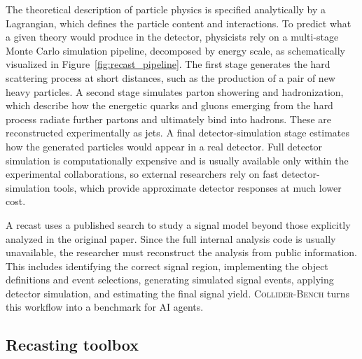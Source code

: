 \documentclass{article}
\newcommand{\ColliderBench}{\textsc{Collider-Bench}}
\begin{document}
The theoretical description of particle physics is specified analytically by a Lagrangian, which defines the particle content and interactions. To predict what a given theory would produce in the detector, physicists rely on a multi-stage Monte Carlo simulation pipeline, decomposed by energy scale, as schematically visualized in Figure~\ref{fig:recast_pipeline}. The first stage generates the hard scattering process at short distances, such as the production of a pair of new heavy particles. A second stage simulates parton showering and hadronization, which describe how the energetic quarks and gluons emerging from the hard process radiate further partons and ultimately bind into hadrons. These are reconstructed experimentally as jets. A final detector-simulation stage estimates how the generated particles would appear in a real detector. Full detector simulation is computationally expensive and is usually available only within the experimental collaborations, so external researchers rely on fast detector-simulation tools, which provide approximate detector responses at much lower cost.

A recast uses a published search to study a signal model beyond those explicitly analyzed in the original paper. Since the full internal analysis code is usually unavailable, the researcher must reconstruct the analysis from public information. This includes identifying the correct signal region, implementing the object definitions and event selections, generating simulated signal events, applying detector simulation, and estimating the final signal yield. \ColliderBench{} turns this workflow into a benchmark for AI agents.

\subsection{Recasting toolbox}
\label{app:recasting_toolbox}
\end{document}

